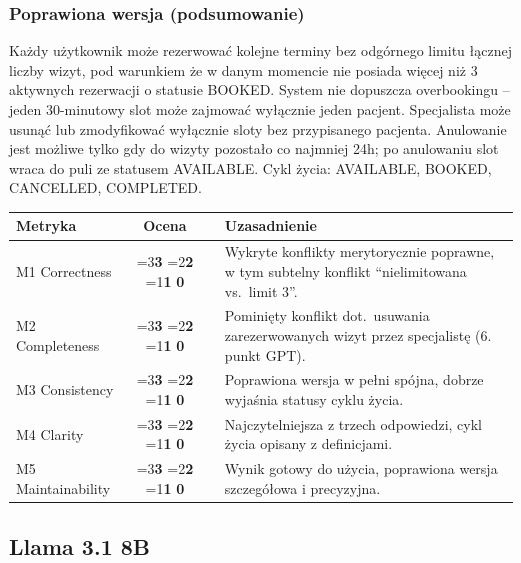 \documentclass[12pt,a4paper]{article}
\newcommand{\scorebox}[1]{%
  \ifnum#1=3\colorbox{score3}{\textbf{3}}%
  \else\ifnum#1=2\colorbox{score2}{\textbf{2}}%
  \else\ifnum#1=1\colorbox{score1}{\textbf{1}}%
  \else\colorbox{score0}{\textbf{0}}\fi\fi\fi
}
\begin{document}
\subsubsection{Poprawiona wersja (podsumowanie)}
\small
Każdy użytkownik może rezerwować kolejne terminy bez odgórnego limitu łącznej liczby wizyt, pod warunkiem że w danym momencie nie posiada więcej niż 3 aktywnych rezerwacji o statusie BOOKED. System nie dopuszcza overbookingu -- jeden 30-minutowy slot może zajmować wyłącznie jeden pacjent. Specjalista może usunąć lub zmodyfikować wyłącznie sloty bez przypisanego pacjenta. Anulowanie jest możliwe tylko gdy do wizyty pozostało co najmniej 24h; po anulowaniu slot wraca do puli ze statusem AVAILABLE. Cykl życia: AVAILABLE, BOOKED, CANCELLED, COMPLETED.
\normalsize

\vspace{0.5em}
\begin{tabular}{lccl}
\toprule
\textbf{Metryka} & \textbf{Ocena} & & \textbf{Uzasadnienie} \\
\midrule
M1 Correctness    & \scorebox{3} && Wykryte konflikty merytorycznie poprawne, w tym subtelny konflikt ``nielimitowana vs.\ limit 3''. \\
M2 Completeness   & \scorebox{2} && Pominięty konflikt dot.\ usuwania zarezerwowanych wizyt przez specjalistę (6. punkt GPT). \\
M3 Consistency    & \scorebox{3} && Poprawiona wersja w pełni spójna, dobrze wyjaśnia statusy cyklu życia. \\
M4 Clarity        & \scorebox{3} && Najczytelniejsza z trzech odpowiedzi, cykl życia opisany z definicjami. \\
M5 Maintainability & \scorebox{3} && Wynik gotowy do użycia, poprawiona wersja szczegółowa i precyzyjna. \\
\bottomrule
\end{tabular}

\vspace{1.5em}

\subsection{\textcolor{llamacolor}{Llama 3.1 8B} }
\end{document}
